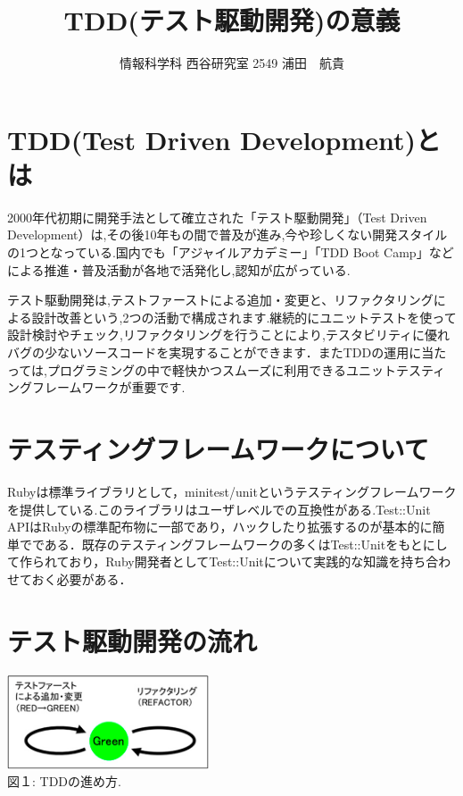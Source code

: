\documentclass[a4j,twocolumn,uplatex]{jsarticle}
\begin{document}
\title{TDD(テスト駆動開発)の意義}
\author{情報科学科 西谷研究室 2549 浦田　航貴}
\date{}
\maketitle
\section{TDD(Test Driven Development)とは}

2000年代初期に開発手法として確立された「テスト駆動開発」（Test Driven Development）は,その後10年もの間で普及が進み,今や珍しくない開発スタイルの1つとなっている.国内でも「アジャイルアカデミー」「TDD Boot Camp」などによる推進・普及活動が各地で活発化し,認知が広がっている\cite{1}.

テスト駆動開発は,テストファーストによる追加・変更と、リファクタリングによる設計改善という,2つの活動で構成されます.継続的にユニットテストを使って設計検討やチェック,リファクタリングを行うことにより,テスタビリティに優れバグの少ないソースコードを実現することができます．またTDDの運用に当たっては,プログラミングの中で軽快かつスムーズに利用できるユニットテスティングフレームワークが重要です\cite{1}.

\section{テスティングフレームワークについて}
Rubyは標準ライブラリとして，minitest/unitというテスティングフレームワークを提供している.このライブラリはユーザレベルでの互換性がある.Test::Unit APIはRubyの標準配布物に一部であり，ハックしたり拡張するのが基本的に簡単でである．既存のテスティングフレームワークの多くはTest::Unitをもとにして作られており，Ruby開発者としてTest::Unitについて実践的な知識を持ち合わせておく必要がある．

\section{テスト駆動開発の流れ}
\begin{center}
\includegraphics[width=6cm]{TDD.png}
\\{図１: TDDの進め方.}
\end{center}
\end{document}
